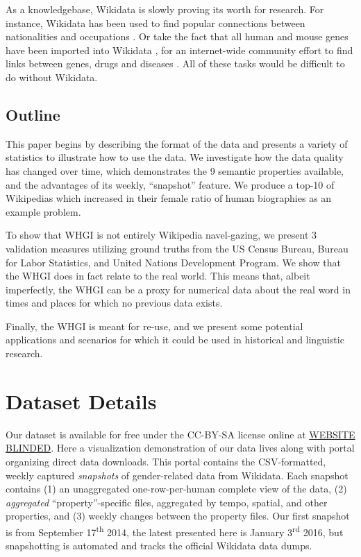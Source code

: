 \documentclass[letterpaper]{article}
\begin{document}
As a knowledgebase, Wikidata is slowly proving its worth for research. For instance, Wikidata has been used to find popular connections between nationalities and occupations \cite{goldfarb_quantifying_2015}. Or take the fact that all human and mouse genes have been imported into Wikidata \cite{mitraka_wikidata:_2015}, for an internet-wide community effort to find links between genes, drugs and diseases \cite{burgstaller-muehlbacher_wikidata_2015}. All of these tasks would be difficult to do without Wikidata.

\subsection{Outline}

This paper begins by describing the format of the data and presents a variety of statistics to illustrate how to use the data. We investigate how the data quality has changed over time, which demonstrates the 9 semantic properties available, and the advantages of its weekly, ``snapshot'' feature. We produce a top-10 of Wikipedias which increased in their female ratio of human biographies as an example problem. 

To show that WHGI is not entirely Wikipedia navel-gazing, we present 3 validation measures utilizing ground truths from the US Census Bureau, Bureau for Labor Statistics, and United Nations Development Program. We show that the WHGI does in fact relate to the real world. This means that, albeit imperfectly, the WHGI can be a proxy for numerical data about the real word in times and places for which no previous data exists.

Finally, the WHGI is meant for re-use, and we present some potential applications and scenarios for which it could be used in historical and linguistic research.  

\section{Dataset Details}

Our dataset is available for free under the CC-BY-SA license online at  \url{WEBSITE BLINDED}. Here a visualization demonstration of our data lives along with portal organizing direct data downloads. 	This portal contains the CSV-formatted, weekly captured \textit{snapshots} of gender-related data from Wikidata. Each snapshot contains (1) an unaggregated one-row-per-human complete view of the data, (2) \textit{aggregated} ``property''-specific files, aggregated by tempo, spatial, and other properties, and (3) weekly changes between the property files. Our first snapshot is from September 17\textsuperscript{th} 2014, the latest presented here is January 3\textsuperscript{rd} 2016, but snapshotting is automated and tracks the official Wikidata data dumps.
\end{document}
